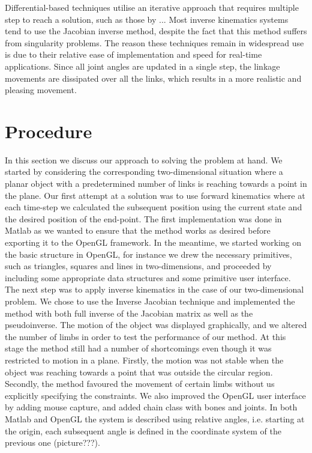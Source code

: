 \documentclass[paper=a4, fontsize=11pt]{scrartcl} %
\numberwithin{equation}{section} %
\numberwithin{figure}{section} %
\numberwithin{table}{section} %
\begin{document}
Differential-based techniques utilise an iterative approach that requires multiple step to reach a solution, such as those by ... Most inverse kinematics systems tend to use the Jacobian inverse method, despite the fact that this method suffers from singularity problems. The reason these techniques remain in widespread use is due to their relative ease of implementation and speed for real-time applications. Since all joint angles are updated in a single step, the linkage movements are dissipated over all the links, which results in a more realistic and pleasing movement. \\




\section{Procedure}
In this section we discuss our approach to solving the problem at hand. We started by considering the corresponding two-dimensional situation where a planar object with a predetermined number of links is reaching towards a point in the plane. Our first attempt at a solution was to use forward kinematics where at each time-step we calculated the subsequent position using the current state and the desired position of the end-point. The first implementation was done in Matlab as we wanted to ensure that the method works as desired before exporting it to the OpenGL framework. In the meantime, we started working on the basic structure in OpenGL, for instance we drew the necessary primitives, such as triangles, squares and lines in two-dimensions, and proceeded by including some appropriate data structures and some primitive user interface. \\

The next step was to apply inverse kinematics in the case of our two-dimensional problem. We chose to use the Inverse Jacobian technique and implemented the method with both full inverse of the Jacobian matrix as well as the pseudoinverse. The motion of the object was displayed graphically, and we altered the number of limbs in order to test the performance of our method. At this stage the method still had a number of shortcomings even though it was restricted to motion in a plane. Firstly, the motion was not stable when the object was reaching towards a point that was outside the circular region. Secondly, the method favoured the movement of certain limbs without us explicitly specifying the constraints. We also improved the OpenGL user interface by adding mouse capture, and added chain class with bones and joints. In both Matlab and OpenGL the system is described using relative angles, i.e. starting at the origin, each subsequent angle is defined in the coordinate system of the previous one (picture???). \\
\end{document}

